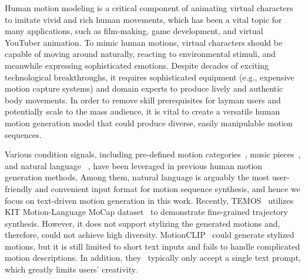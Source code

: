Human motion modeling is a critical component of animating virtual characters to imitate vivid and rich human movements, which has been a vital topic for many applications, such as film-making, game development, and virtual YouTuber animation.
To mimic human motions, virtual characters should be capable of moving around naturally, reacting to environmental stimuli, and meanwhile expressing sophisticated emotions.
Despite decades of exciting technological breakthroughs, it requires sophisticated equipment (e.g., expensive motion capture systems) and domain experts to produce lively and authentic body movements.
In order to remove skill prerequisites for layman users and potentially scale to the mass audience, it is vital to create a versatile human motion generation model that could produce diverse, easily manipulable motion sequences.






Various condition signals, including pre-defined motion categories~\citep{guo2020action2motion,petrovich2021action,cervantes2022implicit}, music pieces~\citep{huang2020dance,li2020learning,li2021ai,zhuang2020music2dance,siyao2022bailando}, and natural language ~\citep{lin2018generating,ahuja2019language2pose,ghosh2021synthesis,petrovich2022temos}, have been leveraged in previous human motion generation methods.
Among them, natural language is arguably the most user-friendly and convenient input format for motion sequence synthesis, and hence we focus on text-driven motion generation in this work.
Recently, TEMOS~\citep{petrovich2022temos} utilizes KIT Motion-Language MoCap dataset~\citep{plappert2016kit} to demonstrate fine-grained trajectory synthesis.
However, it does not support stylizing the generated motions and, therefore, could not achieve high diversity.
MotionCLIP~\citep{tevet2022motionclip} could generate stylized motions, but it is still limited to short text inputs and fails to handle complicated motion descriptions.
In addition, they~\citep{petrovich2022temos,tevet2022motionclip} typically only accept a single text prompt, which greatly limits users' creativity.





